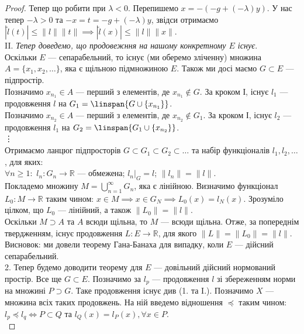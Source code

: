 \documentclass{math_library}
\begin{document}
\begin{proof}
Тепер що робити при $\lambda < 0$. Перепишемо $x = -(-g + (-\lambda)y)$. У нас тепер $-\lambda > 0$ та $-x = t = -g + (-\lambda)y$, звідси отримаємо\\
$|\tilde{l}(t)| \leq \|l\| \|t\| \implies |\tilde{l}(x)| \leq \|l\| \|x\|$.
\bigskip \\
II. \textit{Тепер доведемо, що продовежння на нашому конкретному $E$ існує}.\\
Оскільки $E$ --- сепарабельний, то існує (ми оберемо зліченну) множина $A = \{x_1,x_2,\dots\}$, яка є щільною підмножиною $E$. Також ми досі маємо $G \subset E$ --- підпростір.\\
Позначимо $x_{n_1} \in A$ --- перший з елементів, де $x_{n_1} \notin G$. За кроком І, існує $l_1$ --- продовження $l$ на $G_1 = \linspan\{G \cup \{x_{n_1}\}\}$.\\
Позначимо $x_{n_2} \in A$ --- перший з елементів, де $x_{n_2} \notin G_1$. За кроком І, існує $l_2$ --- продовження $l_1$ на $G_2 = \linspan\{G_1 \cup \{x_{n_2}\}\}$.\\
\vdots \\
Отримаємо ланцюг підпросторів $G \subset G_1 \subset G_2 \subset \dots$ та набір функціоналів $l_1,l_2,\dots$, для яких:\\
$\forall n \geq 1:$ \qquad $l_n \colon G_n \to \mathbb{R}$ --- обмежена; \qquad $l_n|_G = l$; \qquad $\|l_n\| = \|l\|$.\\
Покладемо множину $M = \displaystyle\bigcup_{n=1}^\infty G_n$, яка є лінійною. Визначимо функціонал $L_0 \colon M \to \mathbb{R}$ таким чином: $x \in M \implies x \in G_N \implies L_0(x) = l_N(x)$. Зрозуміло цілком, що $L_0$ --- лінійний, а також $\|L_0\| = \|l\|$.\\
Оскільки $M \supset A$ та $A$ всюди щільна, то $M$ --- всюди щільна. Отже, за попереднім твердженням, існує продовження $L \colon E \to \mathbb{R}$, для якого $\|L\| = \|L_0\| = \|l\|$.\\
Висновок: ми довели теорему Гана-Банаха для випадку, коли $E$ --- дійсний сепарабельний.
\bigskip \\
2. Тепер будемо доводити теорему для $E$ --- довільний дійсний нормований простір. Все ще $G \subset E$. Позначимо за $l_p$ --- продовження $l$  зі збереженням норми на множині $P \supset G$. Таке продовження існує див (1. та I.). Позначимо $X$ --- множина всіх таких продовжень. На ній введемо відношення $\preceq$ таким чином:\\
$l_p \preceq l_q \iff P \subset Q$ та $l_Q(x) = l_P(x), \forall x \in P$.\\

\end{proof}
\end{document}
